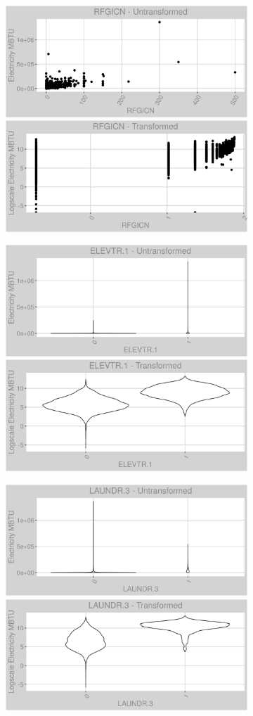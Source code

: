 \FloatBarrier
\newpage
\begin{figure}
\centering
\begin{subfigure}{1\textwidth}
\centering
\includegraphics[width=.49\textwidth, height=0.3\textheight]{Images/electricity_var_original_9.png}
\includegraphics[width=.49\textwidth, height=0.3\textheight]{Images/electricity_var_transformed_9.png}
\end{subfigure}
\begin{subfigure}{1\textwidth}
\centering
\includegraphics[width=.49\textwidth, height=0.3\textheight]{Images/electricity_var_original_10.png}
\includegraphics[width=.49\textwidth, height=0.3\textheight]{Images/electricity_var_transformed_10.png}
\end{subfigure}
\begin{subfigure}{1\textwidth}
\centering
\includegraphics[width=.49\textwidth, height=0.3\textheight]{Images/electricity_var_original_11.png}
\includegraphics[width=.49\textwidth, height=0.3\textheight]{Images/electricity_var_transformed_11.png}
\end{subfigure}
\end{figure}
